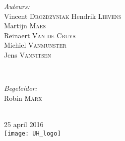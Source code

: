 \begin{titlepage}
\begin{minipage}{0.4\textwidth}
\begin{flushleft} \large
\emph{Auteurs:}\\
Vincent \textsc{Drozdzyniak} %
Hendrik \textsc{Lievens} \\ 
Martijn \textsc{Maes} \\
Reinaert \textsc{Van de Cruys} \\
Michiel \textsc{Vanmunster} \\
Jens \textsc{Vannitsen}
\end{flushleft}
\end{minipage}
~
\begin{minipage}{0.4\textwidth}
\begin{flushright} \large
\emph{Begeleider:} \\
Robin \textsc{Marx}
\end{flushright}
\end{minipage}\\[2.5cm]




{\large 25 april 2016}\\[2cm] %


\texttt{[image: UH\_logo]}\\[2cm] %
 

\vfill %

\end{titlepage}